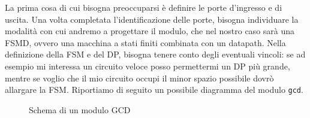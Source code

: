 \documentclass[10pt,a4paper,oneside]{scrbook}
\begin{document}
\noindent
La prima cosa di cui bisogna preoccuparsi è definire le porte d'ingresso e di uscita. Una volta completata
l'identificazione delle porte, bisogna individuare la modalità con cui andremo a progettare il modulo,
che nel nostro caso sarà una FSMD, ovvero una macchina a stati finiti combinata con un datapath. 
Nella definizione della FSM e del DP, bisogna tenere conto degli eventuali vincoli: se ad esempio mi interessa un circuito veloce posso permettermi un DP più grande, mentre se voglio che il mio circuito occupi il minor spazio possibile dovrò allargare la FSM.
Riportiamo di seguito un possibile diagramma del modulo \texttt{gcd}.
\begin{figure}[h]
    \centering
    \label{img:gcd_scheme}
    \caption{Schema di un modulo GCD}
\end{figure}
\end{document}
